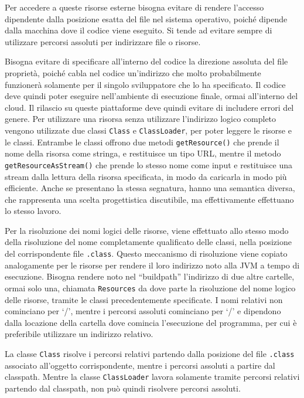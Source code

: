 \documentclass{article}
\numberwithin{equation}{subsection}
\begin{document}
Per accedere a queste risorse esterne bisogna evitare di rendere l'accesso dipendente dalla posizione esatta del file nel sistema operativo, poiché dipende dalla macchina dove il codice 
viene eseguito. Si tende ad evitare sempre di utilizzare percorsi assoluti per indirizzare file o risorse.  

Bisogna evitare di specificare all'interno del codice la direzione assoluta del file proprietà, poiché cabla nel codice un'indirizzo che molto probabilmente funzionerà 
solamente per il singolo sviluppatore che lo ha specificato. Il codice deve quindi poter eseguire nell'ambiente di esecuzione finale, ormai all'interno del cloud. Il rilascio 
su queste piattaforme deve quindi evitare di includere errori del genere. 
Per utilizzare una risorsa senza utilizzare l'indirizzo logico completo vengono utilizzate due classi \verb|Class| e \verb|ClassLoader|, per poter leggere le risorse e le classi. 
Entrambe le classi offrono due metodi \verb|getResource()| che prende il nome della risorsa come stringa, e restituisce un tipo URL, mentre il metodo \verb|getResourceAsStream()| che 
prende lo stesso nome come input e restituisce una stream dalla lettura della risorsa specificata, in modo da caricarla in modo più efficiente. Anche se presentano la 
stessa segnatura, hanno una semantica diversa, che rappresenta una scelta progettistica discutibile, ma effettivamente effettuano lo stesso lavoro. 

Per la risoluzione dei nomi logici delle risorse, viene effettuato allo stesso modo della risoluzione del nome completamente qualificato delle classi, nella posizione del 
corrispondente file \verb|.class|. 
Questo meccanismo di risoluzione viene copiato analogamente per le risorse per rendere il loro indirizzo noto alla JVM a tempo di esecuzione. 
Bisogna rendere noto nel ``buildpath'' l'indirizzo di due altre cartelle, ormai solo una, chiamata \verb|Resources| da dove parte la risoluzione del nome logico delle risorse, 
tramite le classi precedentemente specificate. I nomi relativi non cominciano per `/', mentre i percorsi assoluti cominciano per `/' e dipendono dalla locazione della cartella 
dove comincia l'esecuzione del programma, per cui è preferibile utilizzare un indirizzo relativo. 

La classe \verb|Class| risolve i percorsi relativi partendo dalla posizione del file \verb|.class| associato all'oggetto corrispondente, mentre i percorsi assoluti a partire dal 
classpath. Mentre la classe \verb|ClassLoader| lavora solamente tramite percorsi relativi partendo dal classpath, non può quindi risolvere percorsi assoluti.  
\end{document}
